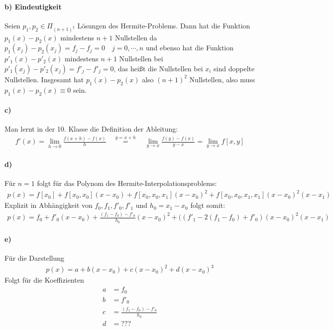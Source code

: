 \paragraph*{b) Eindeutigkeit}
Seien $p_1, p_2 \in \Pi_{(n+1)^2}$ Lösungen des Hermite-Problems. Dann hat die Funktion
$p_1(x) - p_2(x)$  mindestens $n + 1$ Nullstellen  da
$p_1(x_j) - p_2(x_j) = f_j - f_j = 0 \quad j = 0, \cdots , n$
und ebenso hat die Funktion $p'_1(x) - p'_2(x)$  mindestens $n + 1$ Nullstellen bei
$p'_1(x_j) - p'_2(x_j) = f'_j - f'_j = 0$, das heißt die Nullstellen bei $x_i$ sind
doppelte Nullstellen. Insgesamt hat  $p_1(x) - p_2(x)$ also $(n + 1)^2$ Nullstellen,
also muss $p_1(x) - p_2(x) \equiv 0$ sein.

\paragraph*{c)}
Man lernt in der 10. Klasse die Definition der Ableitung:
\begin{align*}
  f'(x) = \lim_{h \rightarrow 0} \frac{f(x + h) - f(x)}{h} \quad \overset{y = x + h}{=}\quad
  \lim_{y \rightarrow x} \frac{f(y) - f(x)}{y - x} =  \lim_{y \rightarrow x} f[x,y]
\end{align*}

\paragraph*{d)}
Für $n=1$ folgt für das Polynom des Hermite-Interpolationsproblems:
\begin{align*}
	p(x) = f[x_0] + f[x_0,x_0](x-x_0) + f[x_0,x_0,x_1](x-x_0)^2 + f[x_0,x_0,x_1,x_1](x-x_0)^2(x-x_1)
\end{align*}
Explizit in Abhängigkeit von $f_0,f_1,f'_0,f'_1$ und $h_0=x_1-x_0$ folgt somit:
\begin{align*}
	p(x) = f_0 + f'_0(x-x_0) + \frac{(f_1-f_0)-f'_0}{h_0}(x-x_0)^2 +  ((f'_1-2(f_1-f_0)+f'_0)(x-x_0)^2(x-x_1)
\end{align*}
\paragraph*{e)}
Für die Darstellung
\begin{align*}
p(x) = a + b(x-x_0) + c(x-x_0)^2 +  d(x-x_0)^3
\end{align*}
Folgt für die Koeffizienten
\begin{align*}
a &= f_0\\
b &= f'_0\\
c &= \frac{(f_1-f_0)-f'_0}{h_0}\\
d &= ???\\
\end{align*}
